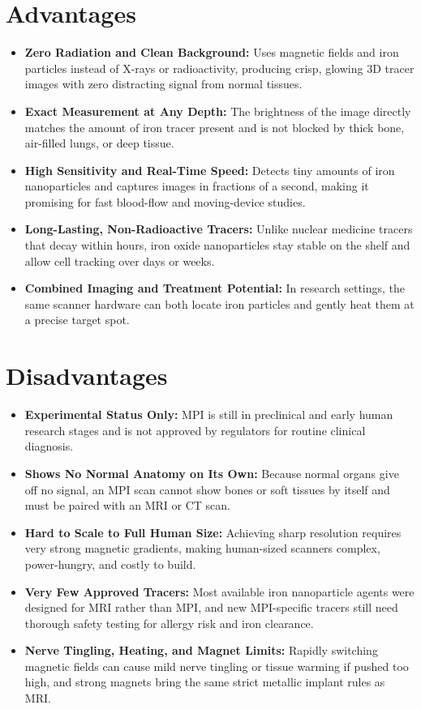 \section{Advantages}

\begin{itemize}
    \item \textbf{Zero Radiation and Clean Background:} Uses magnetic fields and iron particles instead of X-rays or radioactivity, producing crisp, glowing 3D tracer images with zero distracting signal from normal tissues.
    \item \textbf{Exact Measurement at Any Depth:} The brightness of the image directly matches the amount of iron tracer present and is not blocked by thick bone, air-filled lungs, or deep tissue.
    \item \textbf{High Sensitivity and Real-Time Speed:} Detects tiny amounts of iron nanoparticles and captures images in fractions of a second, making it promising for fast blood-flow and moving-device studies.
    \item \textbf{Long-Lasting, Non-Radioactive Tracers:} Unlike nuclear medicine tracers that decay within hours, iron oxide nanoparticles stay stable on the shelf and allow cell tracking over days or weeks.
    \item \textbf{Combined Imaging and Treatment Potential:} In research settings, the same scanner hardware can both locate iron particles and gently heat them at a precise target spot.
\end{itemize}

\section{Disadvantages}

\begin{itemize}
    \item \textbf{Experimental Status Only:} MPI is still in preclinical and early human research stages and is not approved by regulators for routine clinical diagnosis.
    \item \textbf{Shows No Normal Anatomy on Its Own:} Because normal organs give off no signal, an MPI scan cannot show bones or soft tissues by itself and must be paired with an MRI or CT scan.
    \item \textbf{Hard to Scale to Full Human Size:} Achieving sharp resolution requires very strong magnetic gradients, making human-sized scanners complex, power-hungry, and costly to build.
    \item \textbf{Very Few Approved Tracers:} Most available iron nanoparticle agents were designed for MRI rather than MPI, and new MPI-specific tracers still need thorough safety testing for allergy risk and iron clearance.
    \item \textbf{Nerve Tingling, Heating, and Magnet Limits:} Rapidly switching magnetic fields can cause mild nerve tingling or tissue warming if pushed too high, and strong magnets bring the same strict metallic implant rules as MRI.
\end{itemize}

